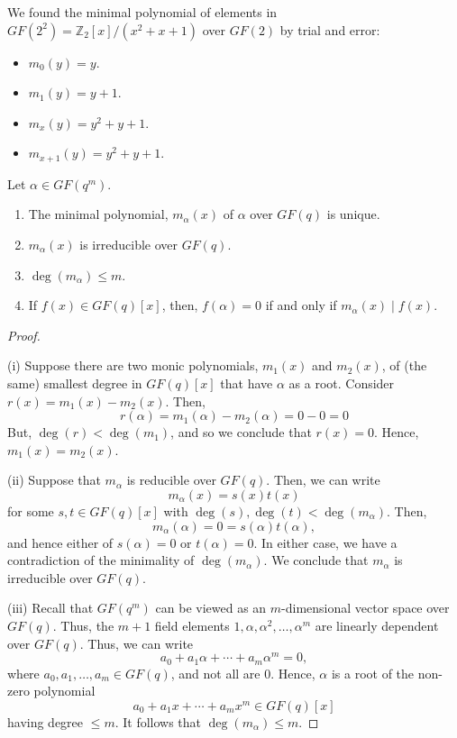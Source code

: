 \begin{exbox}
    \begin{example}
        We found the minimal polynomial of elements in $ GF(2^2)=\mathbb{Z}_2[x]/(x^2+x+1) $
        over $ GF(2) $ by trial and error:
        \begin{itemize}
            \item $ m_0(y)=y $.
            \item $ m_1(y)=y+1 $.
            \item $ m_x(y)=y^2+y+1 $.
            \item $ m_{x+1}(y)=y^2+y+1 $.
        \end{itemize}
    \end{example}
\end{exbox}
\begin{thmbox}
    \begin{theorem}
        Let $ \alpha\in GF(q^m) $.
        \begin{enumerate}[label=(\roman*)]
            \item The minimal polynomial, $ m_\alpha(x) $ of $ \alpha $
                  over $ GF(q) $ is unique.
            \item $ m_\alpha(x) $ is irreducible over $ GF(q) $.
            \item $ \deg(m_\alpha)\leqslant m $.
            \item If $ f(x)\in GF(q)[x] $, then, $ f(\alpha)=0 $ if and only
                  if $ m_\alpha(x)\mid f(x) $.
        \end{enumerate}
    \end{theorem}
\end{thmbox}
\begin{proof} $ \; $

    (i) Suppose there are two monic polynomials, $ m_1(x) $ and $ m_2(x) $,
    of (the same) smallest degree in $ GF(q)[x] $ that have $ \alpha $ as a root. Consider
    $ r(x)=m_1(x)-m_2(x) $. Then,
    \[ r(\alpha)=m_1(\alpha)-m_2(\alpha)=0-0=0 \]
    But, $ \deg(r)<\deg(m_1) $, and so we conclude that $ r(x)=0 $. Hence, $ m_1(x)=m_2(x) $.

    (ii) Suppose that $ m_\alpha $ is reducible over $ GF(q) $. Then, we can write
    \[ m_\alpha(x)=s(x)t(x) \]
    for some $ s,t\in GF(q)[x] $ with $ \deg(s),\deg(t)<\deg(m_\alpha) $. Then,
    \[ m_\alpha(\alpha)=0=s(\alpha)t(\alpha), \]
    and hence either of $ s(\alpha)=0 $ or $ t(\alpha)=0 $. In either case,
    we have a contradiction of the minimality of $ \deg(m_\alpha) $. We conclude
    that $ m_\alpha $ is irreducible over $ GF(q) $.

    (iii) Recall that $ GF(q^m) $ can be viewed as an $ m $-dimensional vector space
    over $ GF(q) $. Thus, the $ m+1 $ field elements $ 1,\alpha,\alpha^2,\ldots ,\alpha^m $
    are linearly dependent over $ GF(q) $. Thus, we can write
    \[ a_0+a_1\alpha+\cdots+a_m\alpha^m=0, \]
    where $ a_0,a_1,\ldots ,a_m\in GF(q) $, and not all are $ 0 $. Hence, $ \alpha $
    is a root of the non-zero polynomial
    \[ a_0+a_1x+\cdots+a_m x^m\in GF(q)[x] \]
    having degree $ \leqslant m $. It follows that $ \deg(m_\alpha) \leqslant m $.
\end{proof}

